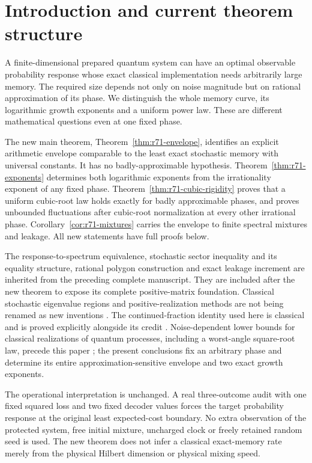 \section{Introduction and current theorem structure}\label{sec:current-overview}\label{sec:introduction}
A finite-dimensional prepared quantum system can have an optimal observable probability response whose exact classical implementation needs arbitrarily large memory. The required size depends not only on noise magnitude but on rational approximation of its phase. We distinguish the whole memory curve, its logarithmic growth exponents and a uniform power law. These are different mathematical questions even at one fixed phase.

The new main theorem, Theorem~\ref{thm:r71-envelope}, identifies an explicit arithmetic envelope comparable to the least exact stochastic memory with universal constants. It has no badly-approximable hypothesis. Theorem~\ref{thm:r71-exponents} determines both logarithmic exponents from the irrationality exponent of any fixed phase. Theorem~\ref{thm:r71-cubic-rigidity} proves that a uniform cubic-root law holds exactly for badly approximable phases, and proves unbounded fluctuations after cubic-root normalization at every other irrational phase. Corollary~\ref{cor:r71-mixtures} carries the envelope to finite spectral mixtures and leakage. All new statements have full proofs below.

The response-to-spectrum equivalence, stochastic sector inequality and its equality structure, rational polygon construction and exact leakage increment are inherited from the preceding complete manuscript. They are included after the new theorem to expose its complete positive-matrix foundation. Classical stochastic eigenvalue regions and positive-realization methods are not being renamed as new inventions \cite{DmitrievDynkin46,JohnsonPaparella17,KirklandSmigoc22,MonrasWinter14}. The continued-fraction identity used here is classical and is proved explicitly alongside its credit \cite{HoneVarona19}. Noise-dependent lower bounds for classical realizations of quantum processes, including a worst-angle square-root law, precede this paper \cite{Fanizza24}; the present conclusions fix an arbitrary phase and determine its entire approximation-sensitive envelope and two exact growth exponents.

The operational interpretation is unchanged. A real three-outcome audit with one fixed squared loss and two fixed decoder values forces the target probability response at the original least expected-cost boundary. No extra observation of the protected system, free initial mixture, uncharged clock or freely retained random seed is used. The new theorem does not infer a classical exact-memory rate merely from the physical Hilbert dimension or physical mixing speed.

